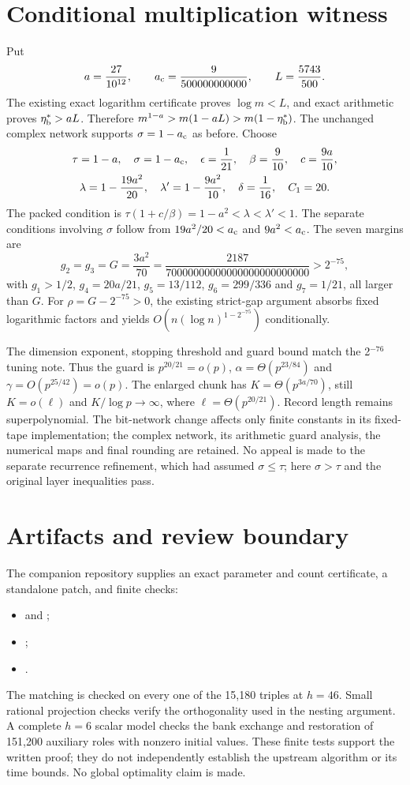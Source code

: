 \documentclass[11pt]{article}
\begin{document}
\section{Conditional multiplication witness}
Put
\[
 a=\frac{27}{10^{12}},\qquad a_{\rm c}=\frac9{500000000000},
 \qquad L=\frac{5743}{500}.
\]
The existing exact logarithm certificate proves $\log m<L$, and exact arithmetic
proves $\eta_{\rm b}^*>aL$. Therefore
$m^{1-a}>m(1-aL)>m(1-\eta_{\rm b}^*)$.
The unchanged complex network supports $\sigma=1-a_{\rm c}$ as before.
Choose
\begin{gather*}
 \tau=1-a,\quad \sigma=1-a_{\rm c},\quad
 \epsilon=\frac1{21},\quad \beta=\frac9{10},\quad c=\frac{9a}{10},\\
 \lambda=1-\frac{19a^2}{20},\quad \lambda'=1-\frac{9a^2}{10},\quad
 \delta=\frac1{16},\quad C_1=20.
\end{gather*}
The packed condition is $\tau(1+c/\beta)=1-a^2<\lambda<\lambda'<1$.
The separate conditions involving $\sigma$ follow from
$19a^2/20<a_{\rm c}$ and $9a^2<a_{\rm c}$. The seven margins are
\[
 g_2=g_3=G=\frac{3a^2}{70}
 =\frac{2187}{70000000000000000000000000}>2^{-75},
\]
with $g_1>1/2$, $g_4=20a/21$, $g_5=13/112$, $g_6=299/336$ and
$g_7=1/21$, all larger than $G$.
For $\rho=G-2^{-75}>0$, the existing strict-gap argument absorbs fixed
logarithmic factors and yields $O(n(\log n)^{1-2^{-75}})$ conditionally.

The dimension exponent, stopping threshold and guard bound match the 2$^{-76}$
tuning note. Thus the guard is $p^{20/21}=o(p)$,
$\alpha=\Theta(p^{23/84})$ and $\gamma=O(p^{25/42})=o(p)$.
The enlarged chunk has $K=\Theta(p^{3a/70})$, still $K=o(\ell)$ and
$K/\log p\to\infty$, where $\ell=\Theta(p^{20/21})$.
Record length remains superpolynomial. The bit-network change affects only
finite constants in its fixed-tape implementation; the complex network, its
arithmetic guard analysis, the numerical maps and final rounding are retained.
No appeal is made to the separate recurrence refinement, which had assumed
$\sigma\le\tau$; here $\sigma>\tau$ and the original layer inequalities pass.

\section{Artifacts and review boundary}
The companion repository supplies an exact parameter and count certificate,
a standalone patch, and finite checks:
\begin{itemize}
\item {} and ;
\item {};
\item {}.
\end{itemize}
The matching is checked on every one of the 15,180 triples at $h=46$.
Small rational projection checks verify the orthogonality used in the nesting
argument. A complete $h=6$ scalar model checks the bank exchange and restoration
of 151,200 auxiliary roles with nonzero initial values. These
finite tests support the written proof; they do not independently establish the
upstream algorithm or its time bounds. No global optimality claim is made.
\end{document}
